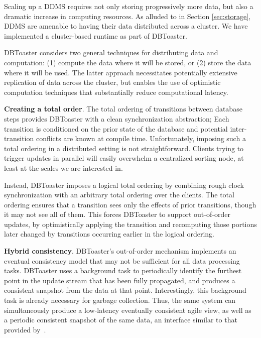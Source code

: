 Scaling up a DDMS requires not only storing progressively more data, but also a
dramatic increase in computing resources.  As alluded to in Section
\ref{sec:storage}, DDMS are amenable to having their data distributed across a
cluster.  We have implemented a cluster-based runtime as part of DBToaster.


DBToaster considers two general techniques for distributing data and
computation: (1) compute the data where it will be stored, or (2) store the data
where it will be used.  The latter approach necessitates potentially extensive
replication of data across the cluster, but enables the use of optimistic
computation techniques that substantially reduce computational latency.

\medspace 

{\bf Creating a total order}\/.
The total ordering of transitions between database steps provides DBToaster with
a clean synchronization abstraction; Each transition is conditioned on the prior
state of the database and potential inter-transition conflicts are known at
compile time.  Unfortunately, imposing such a total ordering in a distributed
setting is not straightforward.  Clients trying to trigger updates in parallel
will easily overwhelm a centralized sorting node, at least at the scales we are
interested in.

Instead, DBToaster imposes a logical total ordering by combining rough clock
synchronization with an arbitrary total ordering over the clients.  The total
ordering ensures that a transition sees only the effects of prior transitions,
though it may not see all of them.  This forces DBToaster to support
out-of-order updates, by optimistically applying the transition and recomputing
those portions later changed by transitions occurring earlier in the logical
ordering.

\medspace

{\bf Hybrid consistency}\/.
DBToaster's out-of-order mechanism implements an eventual consistency model that
may not be sufficient for all data processing tasks.  DBToaster uses a
background task to periodically identify the furthest point in the update stream
that has been fully propagated, and produces a consistent snapshot from the data
at that point.  Interestingly, this background task is already necessary for
garbage collection.  Thus, the same system can simultaneously produce a
low-latency eventually consistent agile view, as well as a periodic consistent
snapshot of the same data, an interface similar to that provided
by~\cite{bayou}.

